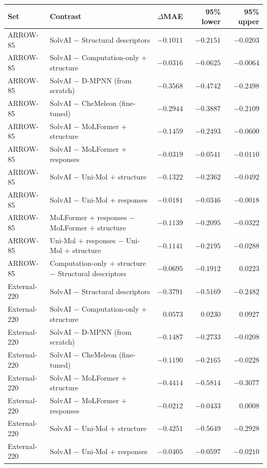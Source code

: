 \begingroup\small
\begin{longtable}{@{}p{}p{}rrr@{}}
\toprule
Set & Contrast & $\Delta$MAE & 95\% lower & 95\% upper \\
\midrule
\endhead
ARROW-85 & SolvAI $-$ Structural descriptors & $-0.1011$ & $-0.2151$ & $-0.0203$ \\
ARROW-85 & SolvAI $-$ Computation-only + structure & $-0.0316$ & $-0.0625$ & $-0.0064$ \\
ARROW-85 & SolvAI $-$ D-MPNN (from scratch) & $-0.3568$ & $-0.4742$ & $-0.2498$ \\
ARROW-85 & SolvAI $-$ CheMeleon (fine-tuned) & $-0.2944$ & $-0.3887$ & $-0.2109$ \\
ARROW-85 & SolvAI $-$ MoLFormer + structure & $-0.1459$ & $-0.2493$ & $-0.0600$ \\
ARROW-85 & SolvAI $-$ MoLFormer + responses & $-0.0319$ & $-0.0541$ & $-0.0110$ \\
ARROW-85 & SolvAI $-$ Uni-Mol + structure & $-0.1322$ & $-0.2362$ & $-0.0492$ \\
ARROW-85 & SolvAI $-$ Uni-Mol + responses & $-0.0181$ & $-0.0346$ & $-0.0018$ \\
ARROW-85 & MoLFormer + responses $-$ MoLFormer + structure & $-0.1139$ & $-0.2095$ & $-0.0322$ \\
ARROW-85 & Uni-Mol + responses $-$ Uni-Mol + structure & $-0.1141$ & $-0.2195$ & $-0.0288$ \\
ARROW-85 & Computation-only + structure $-$ Structural descriptors & $-0.0695$ & $-0.1912$ & $0.0223$ \\
External-220 & SolvAI $-$ Structural descriptors & $-0.3791$ & $-0.5169$ & $-0.2482$ \\
External-220 & SolvAI $-$ Computation-only + structure & $0.0573$ & $0.0230$ & $0.0927$ \\
External-220 & SolvAI $-$ D-MPNN (from scratch) & $-0.1487$ & $-0.2733$ & $-0.0208$ \\
External-220 & SolvAI $-$ CheMeleon (fine-tuned) & $-0.1190$ & $-0.2165$ & $-0.0228$ \\
External-220 & SolvAI $-$ MoLFormer + structure & $-0.4414$ & $-0.5814$ & $-0.3077$ \\
External-220 & SolvAI $-$ MoLFormer + responses & $-0.0212$ & $-0.0433$ & $0.0008$ \\
External-220 & SolvAI $-$ Uni-Mol + structure & $-0.4251$ & $-0.5649$ & $-0.2928$ \\
External-220 & SolvAI $-$ Uni-Mol + responses & $-0.0405$ & $-0.0597$ & $-0.0210$ \\

\end{longtable}
